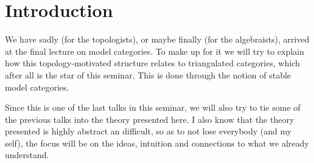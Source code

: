 
\section{Introduction}

We have sadly (for the topologists), 
or maybe finally (for the algebraists), 
arrived at the final lecture on model categories. 
To make up for it we will try to explain how this topology-motivated structure relates to triangulated categories, 
which after all is the star of this seminar. 
This is done through the notion of stable model categories. 

Since this is one of the last talks in this seminar, 
we will also try to tie some of the previous talks into the theory presented here. 
I also know that the theory presented is highly abstract an difficult, 
so as to not lose everybody (and my self), 
the focus will be on the ideas, 
intuition and connections to what we already understand. 